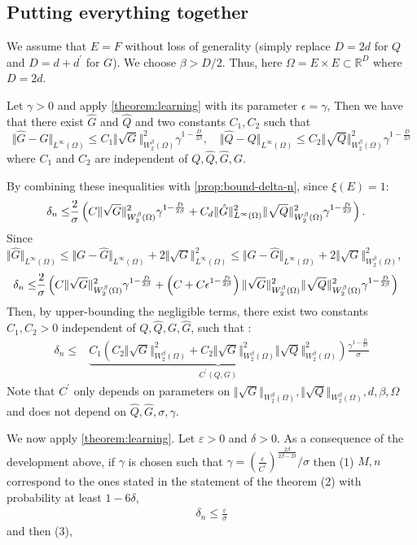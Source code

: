 \subsection{Putting everything together}

We assume that $E=F$ without loss of generality (simply replace $D = 2d$ for $Q$ and $D=d+d^\prime$ for $G$). We choose $\beta > D/2$. Thus, here $\Omega = E\times E\subset \mathbb R^{D}$ where $D=2d$.

Let $\gamma > 0$ and apply \cref{theorem:learning} with its parameter $\epsilon = \gamma$, Then we have that there exist $\hat G$ and $\hat Q$ and two constants $C_1, C_2$ such that
$$\Vert \hat G-G\Vert_{L^\infty(\Omega)}\leq C_1 \Vert \sqrt{G}\Vert^2_{W^\beta_2(\Omega)}\gamma^{1-\frac{D}{2\beta}}, \quad \Vert \hat Q - Q \Vert_{L^\infty(\Omega)}\leq C_2\Vert\sqrt{Q}\Vert^2_{W^\beta_2(\Omega)}\gamma^{1-\frac{D}{2\beta}}$$
where $C_1$ and $C_2$ are independent of $Q,\hat Q, \hat G, G$.

By combining these inequalities with \cref{prop:bound-delta-n}, since $\xi(E) = 1$:
\begin{align}
    \delta_n \leq & \frac{2}{\sigma}\left(C\Vert \sqrt{G}\Vert^2_{W^\beta_2(\Omega)}\gamma^{1- \frac{D}{2\beta}} + C_d \Vert\hat G\Vert_{L^\infty(\Omega)}^2\Vert \sqrt{Q}\Vert^2_{W^\beta_2(\Omega)}\gamma^{1 - \frac{D}{2\beta}}\right).
\end{align}
Since $\Vert \hat G\Vert_{L^\infty(\Omega)} \leq \Vert G - \hat G \Vert_{L^\infty(\Omega)} + 2 \Vert \sqrt{G}\Vert_{L^\infty(\Omega)}^2 \leq \Vert G - \hat G \Vert_{L^\infty(\Omega)} + 2 \Vert \sqrt{G}\Vert^2_{W^\beta_2(\Omega)}$,
\begin{align*}
    \delta_n \leq & \frac{2}{\sigma}\left(C\Vert \sqrt{G}\Vert^2_{W^\beta_2(\Omega)}\gamma^{1- \frac{D}{2\beta}} + \left(C + C\epsilon^{1- \frac{D}{2\beta}}\right)\Vert\sqrt{G}\Vert^2_{W^\beta_2(\Omega)}\Vert\sqrt{Q}\Vert^2_{W^\beta_2(\Omega)}\gamma^{1 - \frac{D}{2\beta}}\right)
\end{align*}
Then, by upper-bounding the negligible terms, there exist two constants $C_1, C_2>0$ independent of $Q, \hat Q, G, \hat G$, such that :
\begin{align}
    \delta_n \leq & \underbrace{C_1\left(C_2 \Vert\sqrt{G}\Vert^2_{W^\beta_2(\Omega)} + C_2\Vert \sqrt{G}\Vert^2_{W^\beta_2(\Omega)}\Vert \sqrt{Q}\Vert^2_{W^\beta_2(\Omega)} \right)}_{C^\prime(Q, G)} \frac{\gamma^{1-\frac{D}{2\beta}}}{\sigma}
\end{align}
Note that $C^\prime$ only depends on parameters on $\Vert \sqrt{G}\Vert_{W^\beta_2(\Omega)}, \Vert \sqrt{Q}\Vert_{W^\beta_2(\Omega)}, d, \beta, \Omega$ and does not depend on $\hat{Q}, \hat{G}, \sigma, \gamma$.

We now apply \cref{theorem:learning}.
Let $\varepsilon > 0$ and $\delta > 0$. As a consequence of the development above, if $\gamma$ is chosen such that $\gamma = \left(\frac{\varepsilon}{C^\prime}\right)^{\frac{2\beta}{2\beta - D}}/\sigma$ then (1) $M, n$ correspond to the ones stated in the statement of the theorem (2)  with probability at least $1-6\delta$,
\begin{align}
    \delta_n \leq \frac{\varepsilon}{\sigma}
\end{align}
and then (3),
